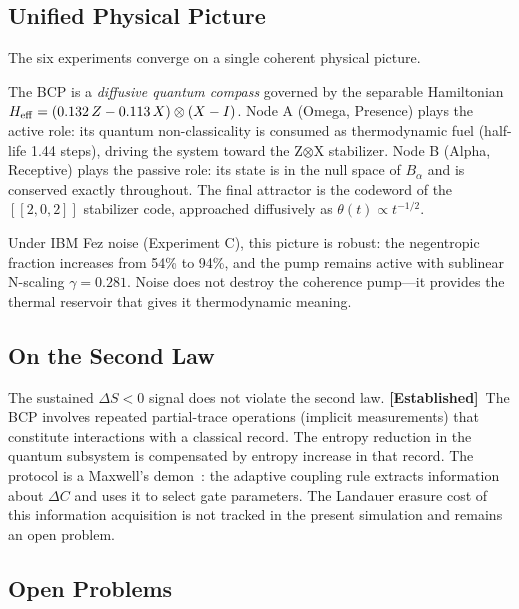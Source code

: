 \documentclass[12pt]{article}
\newcommand{\established}{\textbf{[Established]}}
\begin{document}
\subsection{Unified Physical Picture}

The six experiments converge on a single coherent physical picture.

The BCP is a \emph{diffusive quantum compass} governed by the separable
Hamiltonian $H_{\rm eff}=(0.132\,Z-0.113\,X)\otimes(X-I)$.  Node A
(Omega, Presence) plays the active role: its quantum non-classicality is
consumed as thermodynamic fuel (half-life 1.44 steps), driving the system
toward the Z$\otimes$X stabilizer.  Node B (Alpha, Receptive) plays the
passive role: its state is in the null space of $B_\alpha$ and is
conserved exactly throughout.  The final attractor is the codeword of
the $[[2,0,2]]$ stabilizer code, approached diffusively as
$\theta(t)\propto t^{-1/2}$.

Under IBM Fez noise (Experiment C), this picture is robust: the
negentropic fraction increases from 54\% to 94\%, and the pump remains
active with sublinear N-scaling $\gamma=0.281$.  Noise does not destroy
the coherence pump---it provides the thermal reservoir that gives it
thermodynamic meaning.

\subsection{On the Second Law}

The sustained $\Delta S<0$ signal does not violate the second law.
\established\ The BCP involves repeated partial-trace operations
(implicit measurements) that constitute interactions with a classical
record.  The entropy reduction in the quantum subsystem is compensated
by entropy increase in that record.  The protocol is a Maxwell's
demon~\cite{Maxwell1871,Landauer1961}: the adaptive coupling rule
extracts information about $\Delta C$ and uses it to select gate
parameters.  The Landauer erasure cost of this information acquisition
is not tracked in the present simulation and remains an open problem.

\subsection{Open Problems}
\end{document}
